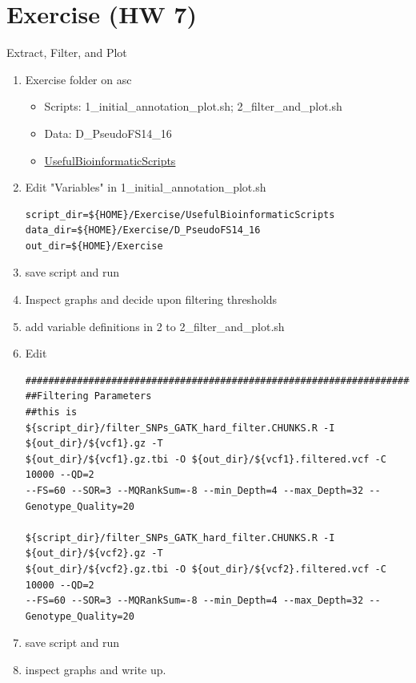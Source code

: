 \documentclass[t,10pt]{beamer}
\begin{document}
\section{Exercise (HW 7)}
\label{sec:orgheadline21}
\begin{frame}[fragile,label={sec:orgheadline20}]{Extract, Filter, and Plot}
 \begin{enumerate}
\item Exercise folder on asc
\begin{itemize}
\item Scripts: 1\_initial\_annotation\_plot.sh; 2\_filter\_and\_plot.sh
\item Data: D\_PseudoFS14\_16
\item \href{https://github.com/ssefick/UsefulBioinformaticScripts}{UsefulBioinformaticScripts}
\end{itemize}
\item Edit "Variables" in 1\_initial\_annotation\_plot.sh
\lstset{language=sh,label= ,caption= ,captionpos=b,numbers=none}
\begin{lstlisting}
script_dir=${HOME}/Exercise/UsefulBioinformaticScripts           
data_dir=${HOME}/Exercise/D_PseudoFS14_16
out_dir=${HOME}/Exercise
\end{lstlisting}

\item save script and run
\item Inspect graphs and decide upon filtering thresholds
\item add variable definitions in \alert{2} to 2\_filter\_and\_plot.sh
\item Edit
\lstset{language=sh,label= ,caption= ,captionpos=b,numbers=none}
\begin{lstlisting}
#################################################################################  
##Filtering Parameters                                                             
##this is                                                                          
${script_dir}/filter_SNPs_GATK_hard_filter.CHUNKS.R -I ${out_dir}/${vcf1}.gz -T    
${out_dir}/${vcf1}.gz.tbi -O ${out_dir}/${vcf1}.filtered.vcf -C 10000 --QD=2       
--FS=60 --SOR=3 --MQRankSum=-8 --min_Depth=4 --max_Depth=32 --Genotype_Quality=20  

${script_dir}/filter_SNPs_GATK_hard_filter.CHUNKS.R -I ${out_dir}/${vcf2}.gz -T    
${out_dir}/${vcf2}.gz.tbi -O ${out_dir}/${vcf2}.filtered.vcf -C 10000 --QD=2       
--FS=60 --SOR=3 --MQRankSum=-8 --min_Depth=4 --max_Depth=32 --Genotype_Quality=20
\end{lstlisting}
\item save script and run
\item inspect graphs and write up.
\end{enumerate}
\end{frame}
\end{document}
